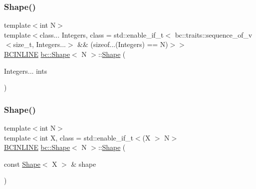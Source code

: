 \mbox{\label{structbc_1_1Shape_a89c3b942f4818a773c4550cb71075160}} 
\subsubsection{\texorpdfstring{Shape()}{Shape()}\hspace{0.1cm}{\footnotesize\ttfamily [2/6]}}
{\footnotesize\ttfamily template$<$int N$>$ \\
template$<$class... Integers, class  = std\+::enable\+\_\+if\+\_\+t$<$			bc\+::traits\+::sequence\+\_\+of\+\_\+v$<$size\+\_\+t, Integers...$>$ \&\&			(sizeof...(\+Integers) == N)$>$$>$ \\
\hyperlink{common_8h_a6699e8b0449da5c0fafb878e59c1d4b1}{B\+C\+I\+N\+L\+I\+NE} \hyperlink{structbc_1_1Shape}{bc\+::\+Shape}$<$ N $>$\+::\hyperlink{structbc_1_1Shape}{Shape} (\begin{DoxyParamCaption}\item[{Integers...}]{ints }\end{DoxyParamCaption})\hspace{0.3cm}{\ttfamily [inline]}}

\mbox{\label{structbc_1_1Shape_a4bfb7c3ce4b36b3528d31656526a2a7a}} 
\subsubsection{\texorpdfstring{Shape()}{Shape()}\hspace{0.1cm}{\footnotesize\ttfamily [3/6]}}
{\footnotesize\ttfamily template$<$int N$>$ \\
template$<$int X, class  = std\+::enable\+\_\+if\+\_\+t$<$(\+X $>$ N$>$ \\
\hyperlink{common_8h_a6699e8b0449da5c0fafb878e59c1d4b1}{B\+C\+I\+N\+L\+I\+NE} \hyperlink{structbc_1_1Shape}{bc\+::\+Shape}$<$ N $>$\+::\hyperlink{structbc_1_1Shape}{Shape} (\begin{DoxyParamCaption}\item[{const \hyperlink{structbc_1_1Shape}{Shape}$<$ X $>$ \&}]{shape }\end{DoxyParamCaption})\hspace{0.3cm}{\ttfamily [inline]}}

\mbox{\label{structbc_1_1Shape_a1ea8742dc5c980c524a2d10eae7b8816}} 
